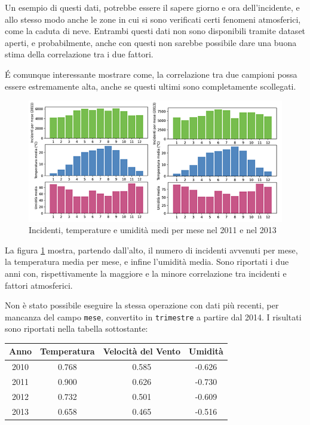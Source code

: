 \documentclass[a4paper,12pt]{report}
\newcommand{\columnstyle}[1]{\texttt{#1}}
\begin{document}
Un esempio di questi dati, potrebbe essere il sapere giorno e ora 
dell'incidente, e allo stesso modo anche le zone in cui si sono verificati certi 
fenomeni atmosferici, come la caduta di neve. 
Entrambi questi dati non sono disponibili tramite dataset aperti, e probabilmente, 
anche con questi non sarebbe possibile dare una buona stima della correlazione 
tra i due fattori.

\'E comunque interessante mostrare come, la correlazione tra due campioni possa essere 
estremamente alta, anche se questi ultimi sono completamente scollegati.
\begin{figure}
    \includegraphics[width=\linewidth]{img_unite/temp_incidenti.png}
    \caption{Incidenti, temperature e umidità medi per mese nel 2011 e nel 2013}
    \label{fig:incidenti-temp}
\end{figure}

La figura \ref{fig:incidenti-temp} mostra, partendo dall'alto, il numero di incidenti 
avvenuti per mese, la temperatura media per mese, e infine l'umidità media.
Sono riportati i due anni con, rispettivamente la maggiore e la minore correlazione tra 
incidenti e fattori atmosferici.

Non è stato possibile eseguire la stessa operazione con dati più recenti, per mancanza del 
campo \columnstyle{mese}, convertito in \columnstyle{trimestre} a partire dal 2014.
I risultati sono riportati nella tabella sottostante: 

\begin{center}
    \def\arraystretch{1.5}%
    \begin{tabular}{ |c|c|c|c| } 
    \hline
    Anno & Temperatura & Velocità del Vento & Umidità \\ 
    \hline
    \rowcolor{TableGray}
    2010 & 0.768 & 0.585 & -0.626 \\
    2011 & 0.900 & 0.626 & -0.730 \\
    \rowcolor{TableGray}
    2012 & 0.732 & 0.501 & -0.609 \\
    2013 & 0.658 & 0.465 & -0.516 \\
    \hline
    \end{tabular}
\end{center}
\end{document}
